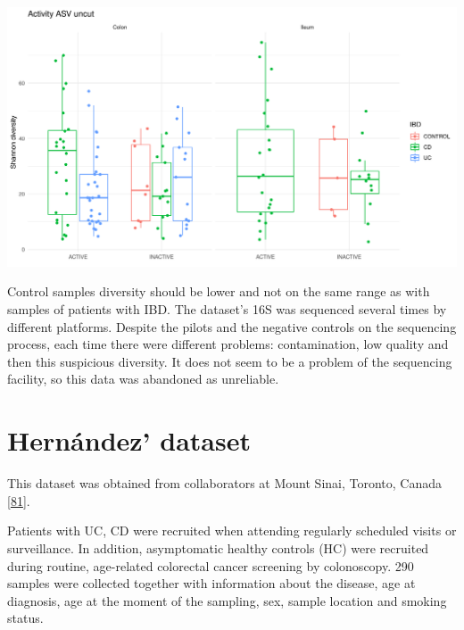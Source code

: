 \documentclass[
  a4paper,
]{book}
\let\origfigure\figure
\let\endorigfigure\endfigure
\renewenvironment{figure}[1][2] {
    \expandafter\origfigure\expandafter[!ht]
} {
    \endorigfigure
}
\begin{document}
\begin{figure}
\includegraphics[width=1\linewidth]{images/barcelona-diversity} \caption[Diversity indices of Barcelona according to the location and disease status.]{Diversity indices of Barcelona according to the location and disease status. There is a lot of diversity between different groups but importantly the control samples overlap with the patients with inflammatory bowel disease.}\label{fig:barcelona-diversity}
\end{figure}

Control samples diversity should be lower and not on the same range as with samples of patients with IBD.
The dataset's 16S was sequenced several times by different platforms.
Despite the pilots and the negative controls on the sequencing process, each time there were different problems: contamination, low quality and then this suspicious diversity.
It does not seem to be a problem of the sequencing facility, so this data was abandoned as unreliable.

\hypertarget{hernandez}{%
\section{Hernández' dataset}\label{hernandez}}

This dataset was obtained from collaborators at Mount Sinai, Toronto, Canada {[}\protect\hyperlink{ref-hernuxe1ndez-rocha2021}{81}{]}.

Patients with UC, CD were recruited when attending regularly scheduled visits or surveillance.
In addition, asymptomatic healthy controls (HC) were recruited during routine, age-related colorectal cancer screening by colonoscopy.
290 samples were collected together with information about the disease, age at diagnosis, age at the moment of the sampling, sex, sample location and smoking status.
\end{document}
